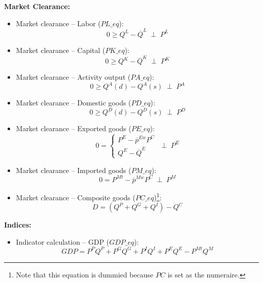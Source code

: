 \documentclass[12pt, a4paper]{article}
\numberwithin{equation}{section}
\numberwithin{figure}{section}
\numberwithin{table}{section}
\begin{document}
\textbf{Market Clearance:}
\begin{itemize}
	\item Market clearance -- Labor (\(PL\_eq\)): 
	\begin{equation}
		0\geq Q^L - \overline{Q}^L \;\perp\; P^L
	\end{equation}
	\item Market clearance -- Capital (\(PK\_eq\)): 
	\begin{equation}
		0\geq Q^K - \overline{Q}^K \;\perp\; P^K
	\end{equation}
	\item Market clearance -- Activity output (\(PA\_eq\)): 
	\begin{equation}
		0\geq Q^{A}(d) - Q^{A}(s)
		\;\perp\; P^A
	\end{equation}
	\item Market clearance -- Domestic goods (\(PD\_eq\)): 
	\begin{equation}
		0\geq Q^{D}(d) - Q^{D}(s)
		\;\perp\; P^D
	\end{equation}
	\item Market clearance -- Exported goods (\(PE\_eq\)): 
	\begin{equation}
		0 = 
		\begin{cases}
			P^E - \overline{p}^{Ew}P^C\\
			Q^E - \overline{Q}^E
		\end{cases}
		\;\perp\; P^E
	\end{equation}
	\item Market clearance -- Imported goods (\(PM\_eq\)): 
	\begin{equation}
		0 = P^{Mt} - \overline{p}^{Mw}P^C
		\;\perp\; P^M
	\end{equation}
	\item Market clearance -- Composite goods (\(PC\_eq\))\footnote{
	Note that this equation is dummied because \(PC\) is set as the numeraire.}: 
	\begin{equation}
		D = \left(Q^P+Q^G+Q^I\right) - Q^C
	\end{equation}
\end{itemize}

\textbf{Indices:}
\begin{itemize}
	\item Indicator calculation -- GDP (\(GDP\_eq\)): 
	\begin{equation}
		GDP = P^{P}Q^{P}+P^{G}Q^{G}+P^{I}Q^{I}+P^{E}Q^{E}-P^{Mt}Q^{M}
	\end{equation}
\end{itemize}
\end{document}
